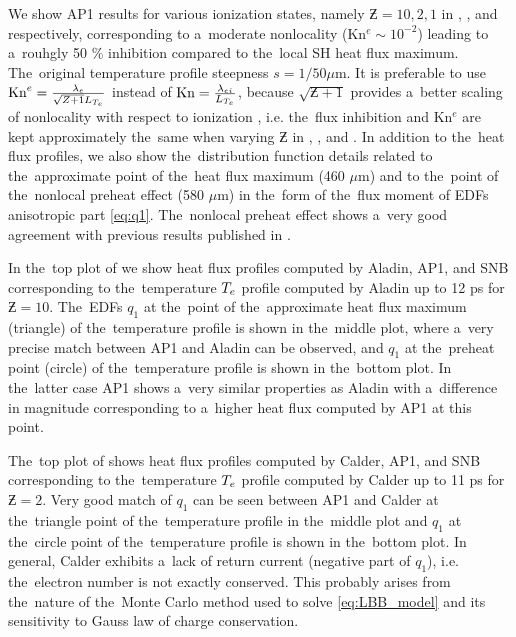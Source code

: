 We show AP1 results for various ionization states, namely $\Zbar= 10, 2, 1$ 
in , , 
and  respectively, corresponding to 
a~moderate nonlocality 
(Kn$^e \sim 10^{-2}$) leading to a~rouhgly 50 $\%$ inhibition compared 
to the~local SH heat flux maximum. The~original temperature profile steepness
$s = 1/50 \mu$m.
It is preferable to use 
$\text{Kn}^e = \frac{\lambda_e}{\sqrt{Z + 1}L_{T_e}}$ instead of
 $\text{Kn} = \frac{\lambda_{ei}}{L_{T_e}}$, because $\sqrt{\Zbar + 1}$ provides 
a~better scaling of nonlocality with respect
to ionization \cite{LMV_1983_7}, i.e. the~flux inhibition and Kn$^e$ are
kept approximately the~same when varying $\Zbar$ in 
, , 
and .
In addition to the~heat flux profiles, we also show the~distribution function 
details related to the~approximate point of the~heat flux maximum (460 $\mu$m) 
and to the~point of the~nonlocal preheat effect (580 $\mu$m) in the~form of
the~flux moment of EDFs anisotropic part \eqref{eq:q1}.
The~nonlocal preheat effect shows a~very good agreement with 
previous results published in \cite{Sherlock_PoP2017}.

In the~top plot of  we show heat flux profiles
computed by Aladin, AP1, and SNB corresponding to the~temperature $T_e$ profile 
computed by Aladin up to 12 ps for $\Zbar = 10$. 
The~EDFs $q_1$ at the~point of the~approximate heat flux maximum (triangle) of
the~temperature profile is shown in the~middle plot, where a~very precise match
between AP1 and Aladin can be observed, and $q_1$ at the~preheat point (circle)
of the~temperature profile is shown in the~bottom plot. In the~latter case
AP1 shows a~very similar properties as Aladin with a~difference in magnitude
corresponding to a~higher heat flux computed by AP1 at this point. 

The~top plot of  shows heat flux profiles
computed by Calder, AP1, and SNB corresponding to the~temperature $T_e$ profile 
computed by Calder up to 11 ps for $\Zbar = 2$. 
Very good match of $q_1$ can be seen between 
AP1 and Calder at the~triangle point of the~temperature profile in the~middle 
plot and $q_1$ at the~circle point of the~temperature profile is shown 
in the~bottom plot. 
In general, Calder exhibits a~lack of 
return current (negative part of $q_1$), i.e. the~electron number is not 
exactly conserved. This probably arises from the~nature of the~Monte Carlo 
method used to solve \eqref{eq:LBB_model} and its sensitivity to Gauss law
of charge conservation.
 

